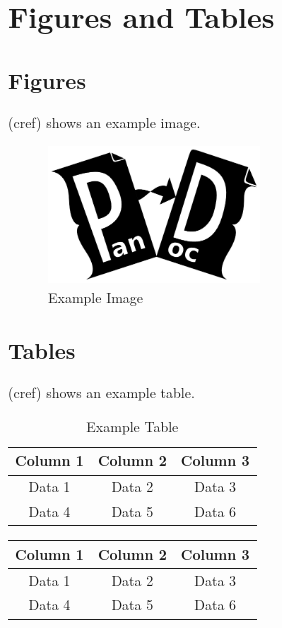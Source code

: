 \documentclass{article}
\begin{document}
\section{Figures and Tables\label{sec:figures_tables}}

\subsection{Figures}
 (cref) shows an example image.

\begin{figure}[H]
    \centering
    \includegraphics[width=0.5\textwidth]{./example-image}
    \caption[short caption]{Example Image}
    \label{fig:example}
\end{figure}

\subsection{Tables}
 (cref) shows an example table.

\begin{table}[H]
    \centering
    \begin{tabular}{|c|c|c|}
        \hline
        Column 1 & Column 2 & Column 3 \\
        \hline
        Data 1 & Data 2 & Data 3 \\
        Data 4 & Data 5 & Data 6 \\
        \hline
    \end{tabular}
    \caption{Example Table}
    \label{tab:example}
\end{table}

\begin{table}[H]
    \centering
    \begin{tabular}{|c|c|c|}
        \hline
        Column 1 & Column 2 & Column 3 \\
        \hline
        Data 1 & Data 2 & Data 3 \\
        Data 4 & Data 5 & Data 6 \\
        \hline
    \end{tabular}
\end{table}
\end{document}
